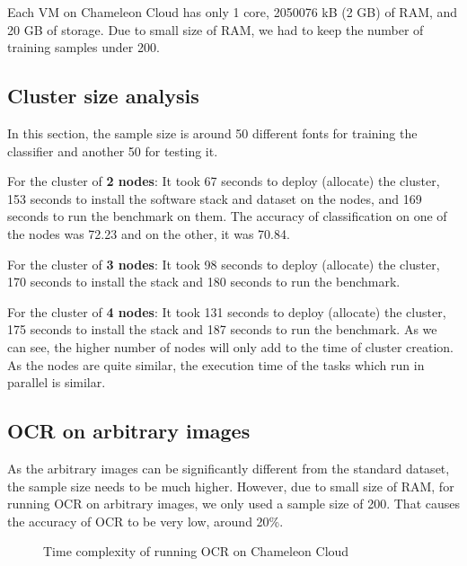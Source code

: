 \documentclass[9pt,twocolumn,twoside]{../../styles/osajnl}
\begin{document}
Each VM on Chameleon Cloud has only 1 core, 2050076 kB (2 GB) of RAM, and 20 GB of storage.
Due to small size of RAM, we had to keep the number of training samples under 200.

\subsection{Cluster size analysis}

In this section, the sample size is around 50 different fonts for training the classifier and another 50 for testing it.

For the cluster of \textbf{2 nodes}:
It took 67 seconds to deploy (allocate) the cluster, 153 seconds to install the software stack
and dataset on the nodes, and 169 seconds to run the benchmark on them. The accuracy of classification on one of the nodes was 72.23 and on the other, it was 70.84.

For the cluster of \textbf{3 nodes}:
It took 98 seconds to deploy (allocate) the cluster, 170 seconds to install the stack and
180 seconds to run the benchmark.

For the cluster of \textbf{4 nodes}:
It took 131 seconds to deploy (allocate) the cluster, 175 seconds to install the stack and
187 seconds to run the benchmark.
As we can see, the higher number of nodes will only add to the time of cluster creation. As the nodes are
quite similar, the execution time of the tasks which run in parallel is similar.

\subsection{OCR on arbitrary images}
As the arbitrary images can be significantly different from 
the standard dataset, the sample size needs to be much higher. However, due to small size of RAM, for running OCR on arbitrary images, we only used a sample size of 200. That causes the accuracy of OCR to be very low, around 20\%.


\begin{figure}[H]
\centering
{}
\caption{Time complexity of running OCR on Chameleon Cloud}
\end{figure}
\end{document}
